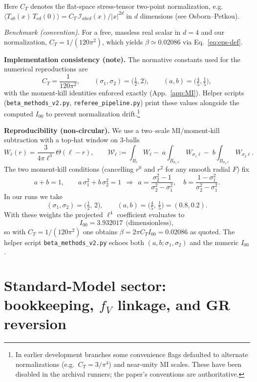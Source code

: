 \documentclass[aps,prd,onecolumn,superscriptaddress,nofootinbib]{revtex4-2}
\begin{document}
\noindent Here \(C_T\) denotes the flat-space stress-tensor two-point normalization, e.g.
\(\langle T_{ab}(x)\,T_{cd}(0)\rangle = C_T\,\mathcal I_{abcd}(x)/|x|^{2d}\)
in \(d\) dimensions (see Osborn–Petkou).

\noindent\emph{Benchmark (convention).} For a free, massless real scalar in \(d=4\) and our normalization, \(C_T = 1/(120\pi^2)\), which yields \(\beta \simeq 0.02086\) via Eq.~\eqref{eq:eps-def}.

\noindent\textbf{Implementation consistency (note).} The normative constants used for the numerical reproductions are
\[
C_T=\frac{1}{120\pi^2},\qquad (\sigma_1,\sigma_2)=\Big(\tfrac{1}{2},2\Big),\qquad (a,b)=\Big(\tfrac{4}{5},\tfrac{1}{5}\Big),
\]
with the moment-kill identities enforced exactly (App.~\ref{app:MI}). Helper scripts (\texttt{beta\_methods\_v2.py}, \texttt{referee\_pipeline.py}) print these values alongside the computed \(I_{00}\) to prevent normalization drift.\footnote{In earlier development branches some convenience flags defaulted to alternate normalizations (e.g.\ \(C_T=3/\pi^4\)) and near-unity MI scales. These have been disabled in the archival runners; the paper’s conventions are authoritative.}

\noindent\textbf{Reproducibility (non‑circular).} We use a two–scale MI/moment‑kill subtraction with a top‑hat window on 3‑balls
\[
W_\ell(r)=\frac{3}{4\pi \ell^3}\,\Theta(\ell-r),\qquad
\mathcal{W}_\ell:=\int_{B_\ell}\!W_\ell-\;a\!\int_{B_{\sigma_1\ell}}\!W_{\sigma_1\ell}-\;b\!\int_{B_{\sigma_2\ell}}\!W_{\sigma_2\ell}.
\]
The two moment‑kill conditions (cancelling \(r^0\) and \(r^2\) for any smooth radial \(F\)) fix
\[
a+b=1,\qquad a\,\sigma_1^2+b\,\sigma_2^2=1
\ \ \Longrightarrow\ \
a=\frac{\sigma_2^2-1}{\sigma_2^2-\sigma_1^2},\quad
b=\frac{1-\sigma_1^2}{\sigma_2^2-\sigma_1^2}.
\]
In our runs we take
\[
(\sigma_1,\sigma_2)=\Big(\tfrac{1}{2},\,2\Big),\qquad (a,b)=\Big(\tfrac{4}{5},\,\tfrac{1}{5}\Big)=(0.8,0.2).
\]
With these weights the projected \(\ell^4\) coefficient evaluates to
\[
I_{00}=3.932017\ \ \text{(dimensionless)},
\]
so with \(C_T=1/(120\pi^2)\) one obtains \(\beta=2\pi C_T I_{00}=0.02086\) as quoted. The helper script \texttt{beta\_methods\_v2.py} echoes both \((a,b;\sigma_1,\sigma_2)\) and the numeric \(I_{00}\).

\section{Standard-Model sector: bookkeeping, \(f_V\) linkage, and GR reversion}
\label{sec:sm-link}
\end{document}
